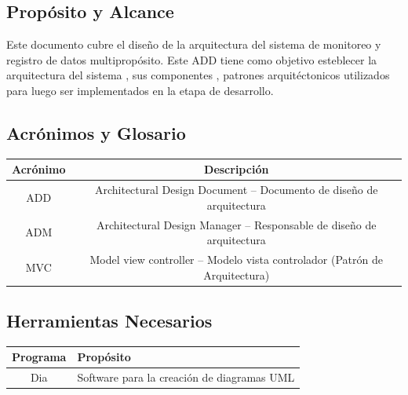 \subsection{\textcolor[gray]{.2}{Propósito y Alcance}}
Este documento cubre el diseño de la arquitectura  del sistema
de monitoreo y registro de datos multipropósito. Este ADD tiene como objetivo
esteblecer la arquitectura del sistema , sus componentes , patrones
arquitéctonicos utilizados para luego ser implementados en la etapa de desarrollo.

\subsection{\textcolor[gray]{.2}{Acrónimos y Glosario}}
\begin{table}[!h]
\begin{center}
\begin{tabular}{|c|c|}
\hline
\rowcolor[gray]{.8} Acrónimo & Descripción \\
\hline
ADD & Architectural Design Document – Documento de diseño de arquitectura\\
\hline
ADM & Architectural Design Manager – Responsable de diseño de arquitectura\\
\hline
MVC & Model view controller – Modelo vista controlador (Patrón de
Arquitectura)\\
\hline
\end{tabular}
\end{center}
\end{table}

\subsection{\textcolor[gray]{.2}{Herramientas Necesarios}}
\begin{table}[!h]
\begin{center}
\begin{tabular}{|c|p{100mm}|}
\hline
\rowcolor[gray]{.8} Programa & Propósito \\
\hline
Dia & Software para la creación de diagramas UML \\
\hline
\end{tabular}
\end{center}
\end{table}

